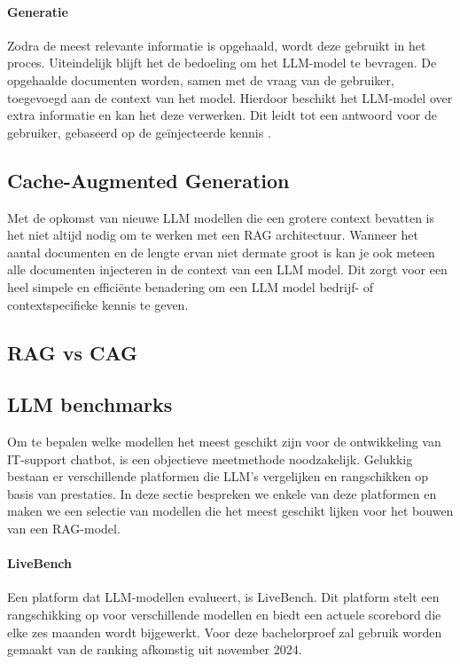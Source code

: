     \paragraph{Generatie}
    
    Zodra de meest relevante informatie is opgehaald, wordt deze gebruikt in het proces. Uiteindelijk blijft het de bedoeling om het LLM-model te bevragen. De opgehaalde documenten worden, samen met de vraag van de gebruiker, toegevoegd aan de context van het model. Hierdoor beschikt het LLM-model over extra informatie en kan het deze verwerken. Dit leidt tot een antwoord voor de gebruiker, gebaseerd op de geïnjecteerde kennis \autocite{zhao2024retrievalaugmentedgenerationaigeneratedcontent}.
    
    \subsection{Cache-Augmented Generation}
    
    Met de opkomst van nieuwe LLM modellen die een grotere context bevatten is het niet altijd nodig om te werken met een RAG architectuur. Wanneer het aantal documenten en de lengte ervan niet dermate groot is kan je ook meteen alle documenten injecteren in de context van een LLM model. Dit zorgt voor een heel simpele en efficiënte benadering om een LLM model bedrijf- of contextspecifieke kennis te geven.
    
    \subsection{RAG vs CAG}
    
    
    \subsection{LLM benchmarks}
    Om te bepalen welke modellen het meest geschikt zijn voor de ontwikkeling van IT-support chatbot, is een objectieve meetmethode noodzakelijk. Gelukkig bestaan er verschillende platformen die LLM's vergelijken en rangschikken op basis van prestaties. In deze sectie bespreken we enkele van deze platformen en maken we een selectie van modellen die het meest geschikt lijken voor het bouwen van een RAG-model.
       
    \paragraph{LiveBench} 
    Een platform dat LLM-modellen evalueert, is LiveBench. Dit platform stelt een rangschikking op voor verschillende modellen en biedt een actuele scorebord die elke zes maanden wordt bijgewerkt. Voor deze bachelorproef zal gebruik worden gemaakt van de ranking afkomstig uit november 2024.
    
